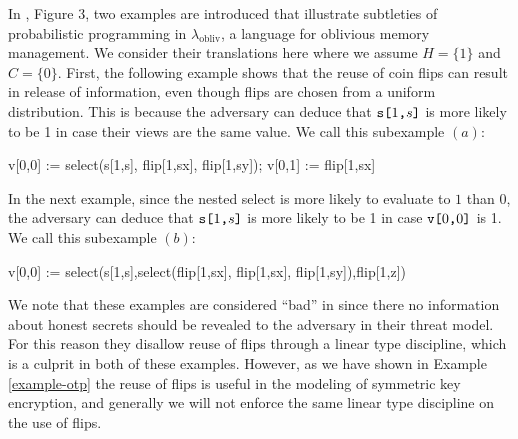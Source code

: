 \begin{example}
  \label{example-lambda-obliv}
  In \cite{XXX}, Figure 3, two examples are introduced that illustrate
  subtleties of probabilistic programming in
  $\lambda_{\mathrm{obliv}}$, a language for oblivious memory
  management. We consider their translations here where we
  assume $H = \{ 1 \}$ and $C = \{ 0 \}$. First, the following
  example shows that the reuse of coin flips can result in release of
  information, even though flips are chosen from a uniform
  distribution. This is because the adversary can deduce that
  $\texttt{s[}1\texttt{,}s\texttt{]}$ is more likely to be 1 in case their views are the
  same value. We call this subexample $(a)$:
  \begin{verbatimtab}
    v[0,0] := select(s[1,s], flip[1,sx], flip[1,sy]);
    v[0,1] := flip[1,sx] \end{verbatimtab}
  In the next example, since the nested select is more likely to evaluate
  to $1$ than $0$, the adversary can deduce that $\texttt{s[}1\texttt{,}s\texttt{]}$ is
  more likely to be 1 in case $\texttt{v[}0\texttt{,}0\texttt{]}$ is 1. We call this subexample $(b)$:
  \begin{verbatimtab}
  v[0,0] := select(s[1,s],select(flip[1,sx], flip[1,sx], flip[1,sy]),flip[1,z]) \end{verbatimtab}
  We note that these examples are considered ``bad'' in \cite{XXX} since there
  no information about honest secrets should be revealed to the adversary in
  their threat model. For this reason they disallow reuse of flips through a
  linear type discipline, which is a culprit in both of these examples. However,
  as we have shown in Example \ref{example-otp} the reuse of flips is useful in
  the modeling of symmetric key encryption, and generally we will not enforce
  the same linear type discipline on the use of flips.
\end{example}

